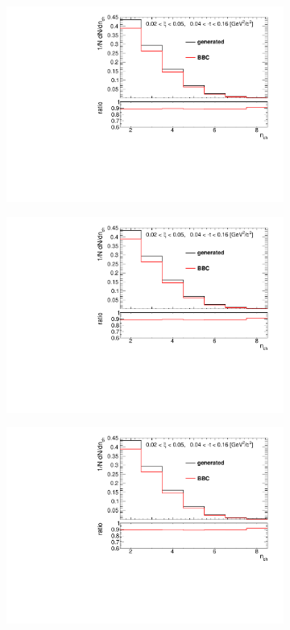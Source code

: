 \begin{figure}[h!]
	\centering
	\begin{subfigure}{.45\textwidth}
		\includegraphics[width=\textwidth,page=9]{chapters/chrgSTAR/img/bbcCorrection/xi_bbc.pdf}
	\end{subfigure}
	\begin{subfigure}{.45\textwidth}
		\includegraphics[width=\textwidth,page=10]{chapters/chrgSTAR/img/bbcCorrection/xi_bbc.pdf}
	\end{subfigure}
	\begin{subfigure}{.45\textwidth}
		\includegraphics[width=\textwidth,page=11]{chapters/chrgSTAR/img/bbcCorrection/xi_bbc.pdf}

\end{subfigure}
\end{figure}
